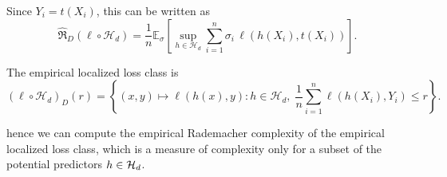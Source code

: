 \documentclass[reqno]{amsart}
\begin{document}
Since $Y_i=t(X_i)$, this can be written as
\[
\widehat{\mathfrak R}_{D}(\ell\circ\mathcal H_d)
=
\frac1n
\mathbb E_\sigma
\left[
\sup_{h\in\mathcal H_d}
\sum_{i=1}^n
\sigma_i\,
\ell(h(X_i),t(X_i))
\right].
\]

The empirical localized loss class is
\[
{(\ell\circ\mathcal H_d)}_D(r)
=
\left\{
(x,y)\mapsto \ell(h(x),y)
:
h\in\mathcal H_d,\;
\frac1n
\sum_{i=1}^n
\ell(h(X_i),Y_i)
\le r
\right\}.
\]

hence we can compute the empirical Rademacher complexity of the empirical localized loss class, which is a measure of complexity only for a subset of the potential predictors $h\in\mathcal{H}_d$. 



\newpage




\newpage

\end{document}
